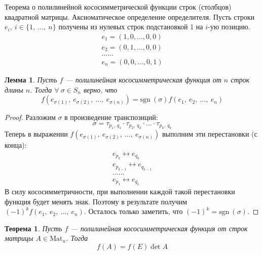 \documentclass[a4paper,12pt]{article}
\newcommand{\Mat}{\mathrm{Mat}}
\newcommand{\sgn}{\mathrm{sgn\:}}
\newtheorem*{theorem}{Теорема}
\newtheorem*{lemma}{Лемма}
\begin{document}
	Теорема о полилинейной кососимметрической функции строк (столбцов) квадратной матрицы. Аксиоматическое определение определителя.
	Пусть строки $e_i,\ i \in \{1,\ \ldots,\ n\}$ получены из нулевых строк подстановкой 1 на $i$-ую позицию.
	\begin{gather*}
	e_1 = (1, 0, \ldots, 0, 0) \\
	e_2 = (0, 1, \ldots, 0, 0) \\
	\ldots\ldots \\
	e_n = (0, 0, \ldots, 0, 1)
	\end{gather*}
	\begin{lemma}
		Пусть $f$ — полилинейная кососимметрическая функция от $n$ строк длины $n$. Тогда $\forall\ \sigma \in S_n$ верно, что
		$$
		f(e_{\sigma(1)},\ e_{\sigma(2)},\ \ldots,\ e_{\sigma(n)}) = \sgn(\sigma)f(e_1,\ e_2,\ \ldots,\ e_n)
		$$
	\end{lemma}
	\begin{proof}
		Разложим $\sigma$ в произведение транспозиций:
		$$
		\sigma = \tau_{p_1,\ q_1} \cdot \tau_{p_2,\ q_2} \cdot \ldots \cdot \tau_{p_k,\ q_k}
		$$
		Теперь в выражении $f(e_{\sigma(1)},\ e_{\sigma(2)},\ \ldots,\ e_{\sigma(n)})$ выполним эти перестановки (с конца):
		\begin{gather*}
		e_{p_k} \leftrightarrow e_{q_k} \\
		e_{p_{k-1}} \leftrightarrow e_{q_{k-1}} \\
		\ldots\ldots \\
		e_{p_1} \leftrightarrow e_{q_1}
		\end{gather*}
		В силу кососимметричности, при выполнении каждой такой перестановки функция будет менять знак. Поэтому в результате получим $(-1)^k f(e_1,\ e_2,\ \ldots,\ e_n)$. Осталось только заметить, что $(-1)^k = \sgn(\sigma)$.
	\end{proof}
	\begin{theorem}
		Пусть $f$ — полилинейная кососимметрическая функция от строк матрицы $A \in \Mat_n$. Тогда
		$$
		f(A) = f(E)\det A
		$$
	\end{theorem}
\end{document}
